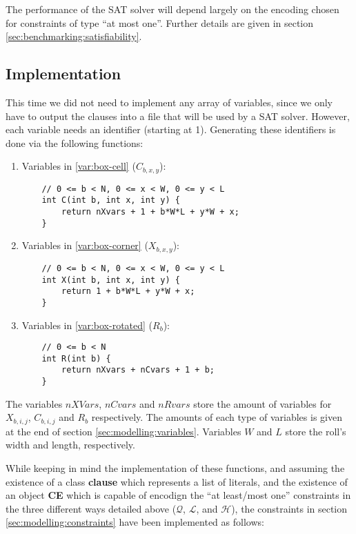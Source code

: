The performance of the SAT solver will depend largely on the encoding chosen for
constraints of type ``at most one''. Further details are given in section
\ref{sec:benchmarking:satisfiability}.

\subsection{Implementation}
\label{sec:satisfiability:implementation}

This time we did not need to implement any array of variables, since
we only have to output the clauses into a file that will be used by a
SAT solver. However, each variable needs an identifier (starting at 1).
Generating these identifiers is done via the following functions:

\begin{enumerate}
	\item Variables in \ref{var:box-cell} ($C_{b,x,y}$):
    
	{\NOINDENT \begin{lstlisting}
	// 0 <= b < N, 0 <= x < W, 0 <= y < L
	int C(int b, int x, int y) {
		return nXvars + 1 + b*W*L + y*W + x;
	}
	\end{lstlisting}}
    
	\item Variables in \ref{var:box-corner} ($X_{b,x,y}$):
    
	{\NOINDENT \begin{lstlisting}
	// 0 <= b < N, 0 <= x < W, 0 <= y < L
	int X(int b, int x, int y) {
		return 1 + b*W*L + y*W + x;
	}
	\end{lstlisting}}
    
	\item Variables in \ref{var:box-rotated} ($R_b$):
    
	{\NOINDENT \begin{lstlisting}
	// 0 <= b < N
	int R(int b) {
		return nXvars + nCvars + 1 + b;
	}
	\end{lstlisting}}
\end{enumerate}

The variables $nXVars$, $nCvars$ and $nRvars$ store the amount of
variables for $X_{b,i,j}$, $C_{b,i,j}$ and $R_b$ respectively. The
amounts of each type of variables is given at the end of section
\ref{sec:modelling:variables}. Variables $W$ and $L$ store the
roll's width and length, respectively.

\hfill

While keeping in mind the implementation of these functions, and
assuming the existence of a class \textbf{clause} which represents a list
of literals, and the existence of an object \textbf{CE} which is capable
of encodign the ``at least/most one'' constraints in the three
different ways detailed above ($\mathcal{Q}$, $\mathcal{L}$, and
$\mathcal{H}$), the constraints in section \ref{sec:modelling:constraints}
have been implemented as follows:

